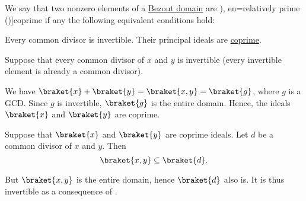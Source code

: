 \begin{definition}\label{def:coprime_elements}\mimprovised
  We say that two nonzero elements of a \hyperref[def:bezout_domain]{Bezout domain} are \term[ru=взаимно простые (\cite[120]{Винберг2014}), en=relatively prime (\cite[113]{Lang2002})]{coprime} if any the following equivalent conditions hold:
  \begin{thmenum}
     Every common divisor is invertible.
     Their principal ideals are \hyperref[def:semiring_ideal/coprime]{coprime}.
  \end{thmenum}
\end{definition}
\begin{defproof}
   Suppose that every common divisor of \( x \) and \( y \) is invertible (every invertible element is already a common divisor).

  We have \( \braket{ x } + \braket{ y } = \braket{ x, y } = \braket{ g } \), where \( g \) is a GCD. Since \( g \) is invertible, \( \braket{ g } \) is the entire domain. Hence, the ideals \( \braket{ x } \) and \( \braket{ y } \) are coprime.

   Suppose that \( \braket{ x } \) and \( \braket{ y } \) are coprime ideals. Let \( d \) be a common divisor of \( x \) and \( y \). Then
  \begin{equation*}
    \braket{ x, y } \subseteq \braket{ d }.
  \end{equation*}

  But \( \braket{ x, y } \) is the entire domain, hence \( \braket{ d } \) also is. It is thus invertible as a consequence of .
\end{defproof}

